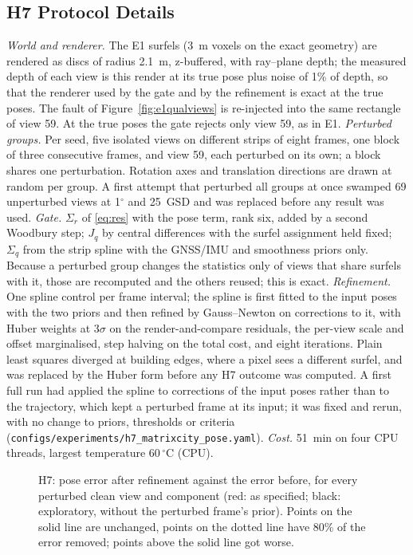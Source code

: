 \subsection{H7 Protocol Details}
\label{sup:h7}
\emph{World and renderer.} The E1 surfels (3~m voxels on the exact geometry) are rendered as discs of radius
2.1~m, z-buffered, with ray--plane depth; the measured depth of each view is this render at its true pose
plus noise of 1\% of depth, so that the renderer used by the gate and by the refinement is exact at the true
poses. The fault of Figure~\ref{fig:e1qualviews} is re-injected into the same rectangle of view 59. At the true
poses the gate rejects only view 59, as in E1.
\emph{Perturbed groups.} Per seed, five isolated views on different strips of eight frames, one block of three
consecutive frames, and view 59, each perturbed on its own; a block shares one perturbation. Rotation axes and
translation directions are drawn at random per group. A first attempt that perturbed all groups at once
swamped 69 unperturbed views at 1$^{\circ}$ and 25~GSD and was replaced before any result was used.
\emph{Gate.} $\Sigma_r$ of \eqref{eq:res} with the pose term, rank six, added by a second Woodbury step;
$J_q$ by central differences with the surfel assignment held fixed; $\Sigma_q$ from the strip spline with the
GNSS/IMU and smoothness priors only. Because a perturbed group changes the statistics only of views that
share surfels with it, those are recomputed and the others reused; this is exact.
\emph{Refinement.} One spline control per frame interval; the spline is first fitted to the input poses with
the two priors and then refined by Gauss--Newton on corrections to it, with Huber weights at $3\sigma$ on the
render-and-compare residuals, the per-view scale and offset marginalised, step halving on the total cost, and
eight iterations. Plain least squares diverged at building edges, where a pixel sees a different surfel, and
was replaced by the Huber form before any H7 outcome was computed. A first full run had applied the spline to
corrections of the input poses rather than to the trajectory, which kept a perturbed frame at its input; it
was fixed and rerun, with no change to priors, thresholds or criteria (\texttt{configs/experiments/h7\_matrixcity\_pose.yaml}).
\emph{Cost.} 51~min on four CPU threads, largest temperature 60\,$^{\circ}$C (CPU).

\begin{figure}[!htbp]
\centering

\caption{H7: pose error after refinement against the error before, for every perturbed clean view and
component (red: as specified; black: exploratory, without the perturbed frame's prior). Points on the solid
line are unchanged, points on the dotted line have 80\% of the error removed; points above the solid line got
worse.}
\label{fig:h7scatter}
\end{figure}
\FloatBarrier

